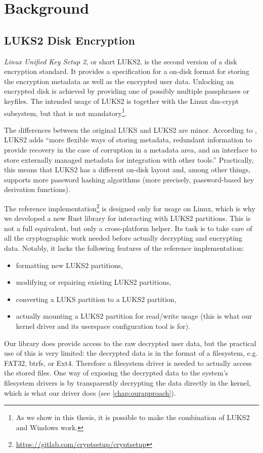 \section{Background}
\label{chap:background}

\subsection{LUKS2 Disk Encryption}
\label{chap:background.luks2}
\emph{Linux Unified Key Setup 2}, or short LUKS2, is the second version of a disk encryption standard. It provides a specification \cite{Broz2018} for a on-disk format for storing the encryption metadata as well as the encrypted user data. Unlocking an encrypted disk is achieved by providing one of possibly multiple passphrases or keyfiles. The intended usage of LUKS2 is together with the Linux dm-crypt subsystem, but that is not mandatory\footnote{\label{fn:luks2windows} As we show in this thesis, it is possible to make the combination of LUKS2 and Windows work.}.

The differences between the original LUKS and LUKS2 are minor. According to \cite{Broz2018}, LUKS2 adds ``more flexible ways of storing metadata, redundant information to provide recovery in the case of corruption in a metadata area, and an interface to store externally managed metadata for integration with other tools.'' Practically, this means that LUKS2 has a different on-disk layout and, among other things, supports more password hashing algorithms (more precisely, password-based key derivation functions).

The reference implementation\footnote{\label{fn:background.luks2.referenceimpl} \url{https://gitlab.com/cryptsetup/cryptsetup}} is designed only for usage on Linux, which is why we developed a new Rust library for interacting with LUKS2 partitions. This is not a full equivalent, but only a cross-platform helper. Its task is to take care of all the cryptographic work needed before actually decrypting and encrypting data. Notably, it lacks the following features of the reference implementation:
\begin{itemize}[label=\textbf{--}]
	\item formatting new LUKS2 partitions,
	\item modifying or repairing existing LUKS2 partitions,
	\item converting a LUKS partition to a LUKS2 partition,
	\item actually mounting a LUKS2 partition for read/write usage (this is what our kernel driver and its userspace configuration tool is for).
\end{itemize}
Our library does provide access to the raw decrypted user data, but the practical use of this is very limited: the decrypted data is in the format of a filesystem, e.g. FAT32, btrfs, or Ext4. Therefore a filesystem driver is needed to actually access the stored files. One way of exposing the decrypted data to the system's filesystem drivers is by transparently decrypting the data directly in the kernel, which is what our driver does (see \autoref{chap:ourapproach}).

